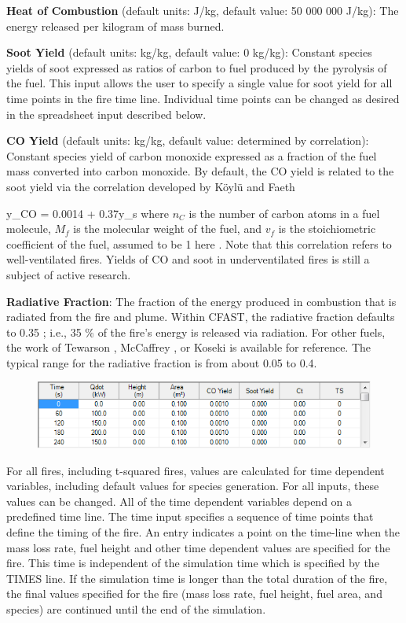 \textbf{Heat of Combustion} (default units: J/kg, default value: 50 000 000 J/kg): The energy released per kilogram of mass burned.

\textbf{Soot Yield} (default units: kg/kg, default value: 0 kg/kg): Constant species yields of soot expressed as ratios of carbon to fuel produced by the pyrolysis of the fuel. This input allows the user to specify a single value for soot yield for all time points in the fire time line. Individual time points can be changed as desired in the spreadsheet input described below.

\textbf{CO Yield} (default units: kg/kg, default value: determined by correlation): Constant species yield of carbon monoxide expressed as a fraction of the fuel mass converted into carbon monoxide.  By default, the CO yield is related to the soot yield via the correlation developed by K\"oyl\"u and Faeth

\be
y_{CO} = 0.0014 + 0.37y_s \label{eq:Koylu}
\ee
where $n_C$ is the number of carbon atoms in a fuel molecule, $M_f$ is the molecular weight of the fuel, and $v_f$ is the stoichiometric coefficient of the fuel, assumed to be 1 here \cite{Koylu:1991}. Note that this correlation refers to well-ventilated fires. Yields of CO and soot in underventilated fires is still a subject of active research.

\textbf{Radiative Fraction}: The fraction of the energy produced in combustion that is radiated from the fire and plume. Within CFAST, the radiative fraction defaults to 0.35 ; i.e., 35 \% of the fire’s energy is released via radiation.  For other fuels, the work of Tewarson \cite{Tewarson:2003}, McCaffrey \cite{McCaffrey:1982}, or Koseki \cite{Koseki:1989} is available for reference.  The typical range for the radiative fraction is from about 0.05 to 0.4.

\begin{figure}[h!]
\begin{center}
\includegraphics[width=6.219in]{FIGURES/Input_File/Fire_Spreadsheet}
\end{center}
\end{figure}

For all fires, including t-squared fires, values are calculated for time dependent variables, including default values for species generation. For all inputs, these values can be changed. All of the time dependent variables depend on a predefined time line. The time input specifies a sequence of time points that define the timing of the fire.  An entry indicates a point on the time-line when the mass loss rate, fuel height and other time dependent values are specified for the fire.  This time is independent of the simulation time which is specified by the TIMES line. If the simulation time is longer than the total duration of the fire, the final values specified for the fire (mass loss rate, fuel height, fuel area, and species) are continued until the end of the simulation.


